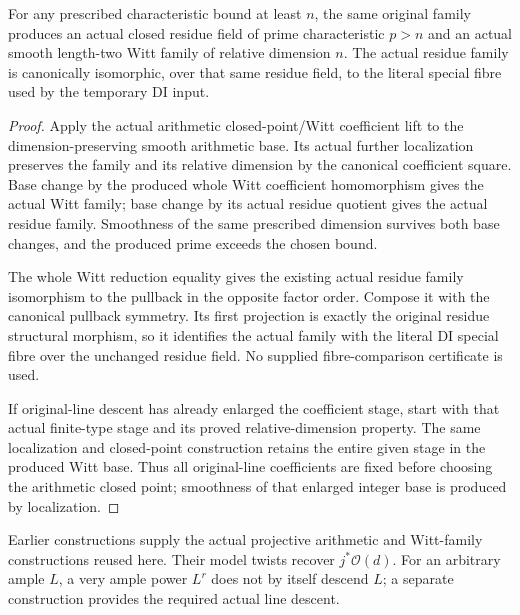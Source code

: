 \begin{theorem}
\label{thm:kn-arithmetic-original-dimension-witt}
\leanok
{}
For any prescribed characteristic bound at least $n$, the same
original family produces an actual closed residue field of prime
characteristic $p>n$ and an actual smooth length-two Witt family of
relative dimension $n$. The actual residue family is canonically
isomorphic, over that same residue field, to the literal special
fibre used by the temporary DI input.
\end{theorem}
\begin{proof}
Apply the actual arithmetic closed-point/Witt coefficient lift to
the dimension-preserving smooth arithmetic base. Its actual further
localization preserves the family and its relative dimension by the
canonical coefficient square. Base change by the produced whole
Witt coefficient homomorphism gives the actual Witt family; base
change by its actual residue quotient gives the actual residue
family. Smoothness of the same prescribed dimension survives both
base changes, and the produced prime exceeds the chosen bound.

The whole Witt reduction equality gives the existing actual residue
family isomorphism to the pullback in the opposite factor order.
Compose it with the canonical pullback symmetry. Its first projection
is exactly the original residue structural morphism, so it identifies
the actual family with the literal DI special fibre over the
unchanged residue field. No supplied fibre-comparison certificate
is used.

If original-line descent has already enlarged the coefficient stage,
start with that actual finite-type stage and its proved
relative-dimension property. The same localization and closed-point
construction retains the entire given stage in the produced Witt
base. Thus all original-line coefficients are fixed before choosing
the arithmetic closed point; smoothness of that enlarged integer
base is produced by localization.
\end{proof}

Earlier constructions supply the actual projective arithmetic and Witt-family
constructions reused here. Their model twists recover
$j^*\mathcal O(d)$. For an arbitrary ample $L$, a very ample power
$L^r$ does not by itself descend $L$; a separate construction
provides the required actual line descent.
